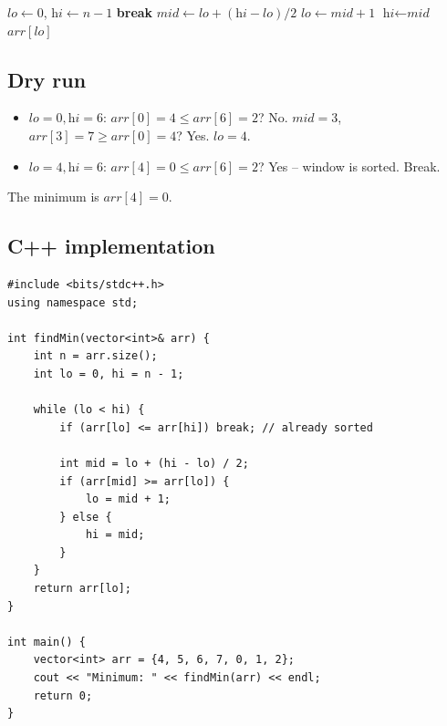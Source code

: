 \begin{algorithm}[H]
\caption{Find Minimum in Rotated Sorted Array}
\begin{algorithmic}[1]
  \State $\textit{lo} \gets 0$, $\textit{hi} \gets n-1$
      \State \textbf{break}
    \EndIf
    \State $\textit{mid} \gets \textit{lo}+(\textit{hi}-\textit{lo})/2$
      \State $\textit{lo} \gets \textit{mid} + 1$
    \Else
      \State $\textit{hi} \gets \textit{mid}$
    \EndIf
  \EndWhile
  \State \Return $\textit{arr}[\textit{lo}]$
\EndProcedure
\end{algorithmic}
\end{algorithm}

\subsection*{Dry run}


\begin{itemize}
  \item $\textit{lo}=0,\textit{hi}=6$: $\textit{arr}[0]=4 \le
        \textit{arr}[6]=2$? No. $\textit{mid}=3$,
        $\textit{arr}[3]=7 \ge \textit{arr}[0]=4$? Yes. $\textit{lo}=4$.
  \item $\textit{lo}=4,\textit{hi}=6$: $\textit{arr}[4]=0 \le
        \textit{arr}[6]=2$? Yes -- window is sorted. Break.
\end{itemize}

The minimum is $\textit{arr}[4] = 0$.

\subsection*{C++ implementation}

\begin{lstlisting}
#include <bits/stdc++.h>
using namespace std;

int findMin(vector<int>& arr) {
    int n = arr.size();
    int lo = 0, hi = n - 1;

    while (lo < hi) {
        if (arr[lo] <= arr[hi]) break; // already sorted

        int mid = lo + (hi - lo) / 2;
        if (arr[mid] >= arr[lo]) {
            lo = mid + 1;
        } else {
            hi = mid;
        }
    }
    return arr[lo];
}

int main() {
    vector<int> arr = {4, 5, 6, 7, 0, 1, 2};
    cout << "Minimum: " << findMin(arr) << endl;
    return 0;
}
\end{lstlisting}

